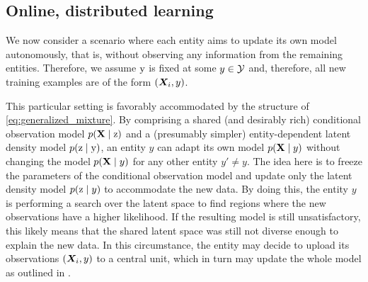 \subsection{Online, distributed learning}
\label{sec:distributed_learning}

We now consider a scenario where each entity aims to update its own model autonomously, that is, without observing any information from the remaining entities. Therefore, we assume ${\textnormal{y}}$ is fixed at some $y \in {\mathcal{Y}}$ and, therefore, all new training examples are of the form $({\bm{X}}_i, y)$.

This particular setting is favorably accommodated by the structure of \eqref{eq:generalized_mixture}. By comprising a shared (and desirably rich) conditional observation model $p({\mathbf{X}} \mid {\textnormal{z}})$ and a (presumably simpler) entity-dependent latent density model $p({\textnormal{z}} \mid {\textnormal{y}})$, an entity $y$ can adapt its own model $p({\mathbf{X}} \mid y)$ without changing the model $p({\mathbf{X}} \mid y)$ for any other entity $y' \neq y$. The idea here is to freeze the parameters of the conditional observation model and update only the latent density model $p({\textnormal{z}} \mid y)$ to accommodate the new data. By doing this, the entity $y$ is performing a search over the latent space to find regions where the new observations have a higher likelihood. If the resulting model is still unsatisfactory, this likely means that the shared latent space was still not diverse enough to explain the new data. In this circumstance, the entity may decide to upload its observations $({\bm{X}}_i, y)$ to a central unit, which in turn may update the whole model as outlined in .
